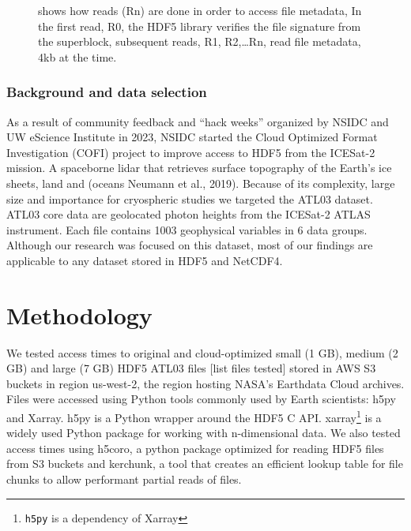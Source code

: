\documentclass[
]{agujournal2019}
\begin{document}
\begin{figure}


\caption{\label{fig-1}shows how reads (Rn) are done in order to access
file metadata, In the first read, R0, the HDF5 library verifies the file
signature from the superblock, subsequent reads, R1, R2,\ldots Rn, read
file metadata, 4kb at the time.}

\end{figure}%

\subsubsection{Background and data
selection}\label{background-and-data-selection}

As a result of community feedback and ``hack weeks'' organized by NSIDC
and UW eScience Institute in 2023, NSIDC started the Cloud Optimized
Format Investigation (COFI) project to improve access to HDF5 from the
ICESat-2 mission. A spaceborne lidar that retrieves surface topography
of the Earth's ice sheets, land and (oceans Neumann et al., 2019).
Because of its complexity, large size and importance for cryospheric
studies we targeted the ATL03 dataset. ATL03 core data are geolocated
photon heights from the ICESat-2 ATLAS instrument. Each file contains
1003 geophysical variables in 6 data groups. Although our research was
focused on this dataset, most of our findings are applicable to any
dataset stored in HDF5 and NetCDF4.

\section{Methodology}\label{methodology}

We tested access times to original and cloud-optimized small (1 GB),
medium (2 GB) and large (7 GB) HDF5 ATL03 files {[}list files tested{]}
stored in AWS S3 buckets in region us-west-2, the region hosting NASA's
Earthdata Cloud archives. Files were accessed using Python tools
commonly used by Earth scientists: h5py and Xarray. h5py is a Python
wrapper around the HDF5 C API. xarray\footnote{\texttt{h5py} is a
  dependency of Xarray} is a widely used Python package for working with
n-dimensional data. We also tested access times using h5coro, a python
package optimized for reading HDF5 files from S3 buckets and kerchunk, a
tool that creates an efficient lookup table for file chunks to allow
performant partial reads of files.
\end{document}
